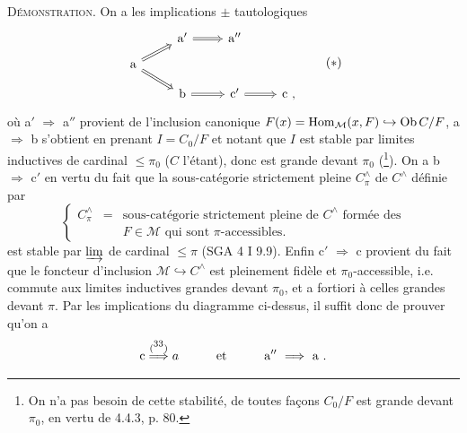 \textsc{Démonstration}. On a les implications $\pm$ tautologiques
\[
\begin{tikzcd}[row sep=small]
 & \mathrm{a}' \arrow[r, Rightarrow] & \mathrm{a}'' & \\
\mathrm{a} \arrow[ur, Rightarrow] \arrow[dr, Rightarrow] & & & \\
 & \mathrm{b} \arrow[r, Rightarrow] & \mathrm{c}' \arrow[r, Rightarrow] & \mathrm{c}\ ,
\end{tikzcd}
\tag*{$(*)$}
\]
où a$'$ $\Longrightarrow$ a$''$ provient de l'inclusion canonique $F(x) = \mathrm{Hom}_{\mathcal{M}}(x,F) \hookrightarrow \mathrm{Ob}\, C/F$, a $\Longrightarrow$ b s'obtient en prenant $I = C_0/F$ et notant que $I$ est stable par limites inductives de cardinal $\leqslant \pi_0$ ($C$ l'étant), donc est grande devant $\pi_0$ (\footnote{On n'a pas besoin de cette stabilité, de toutes façons $C_0/F$ est grande devant $\pi_0$, en vertu de 4.4.3, p. 80.}). On a b $\Longrightarrow$ c$'$ en vertu du fait que la sous-catégorie strictement pleine $C^{\wedge}_{\pi}$ de $C^{\wedge}$ définie par
\[
\left\{
\begin{array}{lcl}
C^{\wedge}_{\pi} & = & \text{sous-catégorie strictement pleine de } C^{\wedge} \text{ formée des}\\
 & & F \in \mathcal{M} \text{ qui sont } \pi\text{-accessibles.}
\end{array}
\right.
\tag*{(4.5.2.2)}
\]
est stable par $\varinjlim$ de cardinal $\leqslant \pi$ (SGA 4 I 9.9). Enfin c$'$ $\Longrightarrow$ c provient du fait que le foncteur d'inclusion $\mathcal{M} \hookrightarrow C^{\wedge}$ est pleinement fidèle et $\pi_0$-accessible, i.e. commute aux limites inductives grandes devant $\pi_0$, et a fortiori à celles grandes devant $\pi$. Par les implications du diagramme ci-dessus, il suffit donc de prouver qu'on a
\[
\mathrm{c} \overset{(\mbox{\footnotemark[33]})}{\Longrightarrow} a \qquad\quad \text{et} \qquad\quad \mathrm{a}'' \ \Longrightarrow\ \mathrm{a}\ .
\]
\setcounter{footnote}{33}


